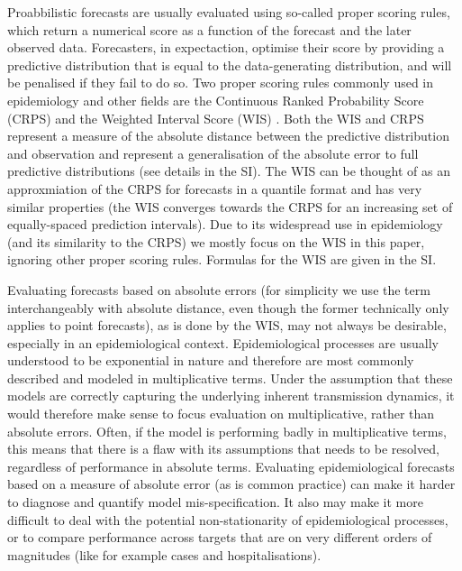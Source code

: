 \documentclass{article}
\begin{document}
Proabbilistic forecasts are usually evaluated using so-called proper scoring rules, which return a numerical score as a function of the forecast and the later observed data. Forecasters, in expectaction, optimise their score by providing a predictive distribution that is equal to the data-generating distribution, and will be penalised if they fail to do so. Two proper scoring rules commonly used in epidemiology and other fields are the Continuous Ranked Probability Score (CRPS) \citep{gneitingStrictlyProperScoring2007} and the Weighted Interval Score (WIS) \citep{bracherEvaluatingEpidemicForecasts2021}. Both the WIS and CRPS represent a measure of the absolute distance between the predictive distribution and observation and represent a generalisation of the absolute error to full predictive distributions (see details in the SI). The WIS can be thought of as an approxmiation of the CRPS for forecasts in a quantile format and has very similar properties (the WIS converges towards the CRPS for an increasing set of equally-spaced prediction intervals). Due to its widespread use in epidemiology (and its similarity to the CRPS) we mostly focus on the WIS in this paper, ignoring other proper scoring rules. Formulas for the WIS are given in the SI. 


Evaluating forecasts based on absolute errors (for simplicity we use the term interchangeably with absolute distance, even though the former technically only applies to point forecasts), as is done by the WIS, may not always be desirable, especially in an epidemiological context. 
Epidemiological processes are usually understood to be exponential in nature and therefore are most commonly described and modeled in multiplicative terms. Under the assumption that these models are correctly capturing the underlying inherent transmission dynamics, it would therefore make sense to focus evaluation on multiplicative, rather than absolute errors. Often, if the model is performing badly in multiplicative terms, this means that there is a flaw with its assumptions that needs to be resolved, regardless of performance in absolute terms. Evaluating epidemiological forecasts based on a measure of absolute error (as is common practice) can make it harder to diagnose and quantify model mis-specification. It also may make it more difficult to deal with the potential non-stationarity of epidemiological processes, or to compare performance across targets that are on very different orders of magnitudes (like for example cases and hospitalisations). 
\end{document}
